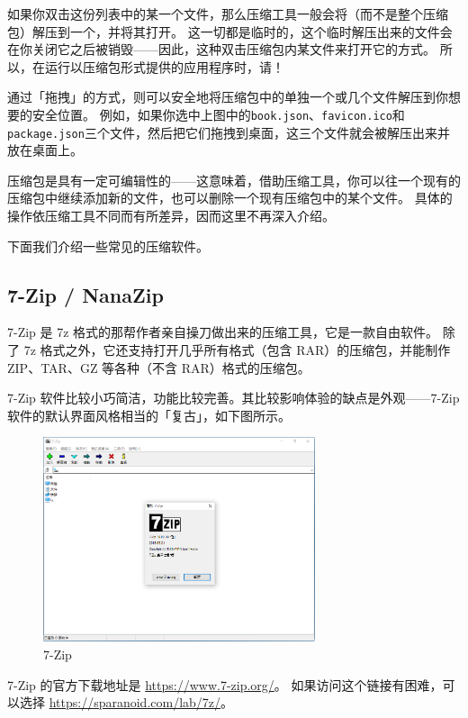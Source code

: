 如果你双击这份列表中的某一个文件，那么压缩工具一般会将（而不是整个压缩包）解压到一个，并将其打开。
这一切都是临时的，这个临时解压出来的文件会在你关闭它之后被销毁——因此，这种双击压缩包内某文件来打开它的方式。
所以，在运行以压缩包形式提供的应用程序时，请！

通过「拖拽」的方式，则可以安全地将压缩包中的单独一个或几个文件解压到你想要的安全位置。
例如，如果你选中上图中的\verb|book.json|、\verb|favicon.ico|和\verb|package.json|三个文件，然后把它们拖拽到桌面，这三个文件就会被解压出来并放在桌面上。

\begin{note}
  压缩包是具有一定可编辑性的——这意味着，借助压缩工具，你可以往一个现有的压缩包中继续添加新的文件，也可以删除一个现有压缩包中的某个文件。
  具体的操作依压缩工具不同而有所差异，因而这里不再深入介绍。
\end{note}

下面我们介绍一些常见的压缩软件。

\subsection{7-Zip / NanaZip}

7-Zip 是 7z 格式的那帮作者亲自操刀做出来的压缩工具，它是一款自由软件。
除了 7z 格式之外，它还支持打开几乎所有格式（包含 RAR）的压缩包，并能制作 ZIP、TAR、GZ 等各种（不含 RAR）格式的压缩包。

7-Zip 软件比较小巧简洁，功能比较完善。其比较影响体验的缺点是外观——7-Zip 软件的默认界面风格相当的「复古」，如下图所示。

\begin{figure}[htb!]
  \centering
  \includegraphics[width=8cm]{assets/7-Zip.png}
  \caption{7-Zip}
  \label{7-Zip}
\end{figure}

7-Zip 的官方下载地址是 \url{https://www.7-zip.org/}。
如果访问这个链接有困难，可以选择 \url{https://sparanoid.com/lab/7z/}。

